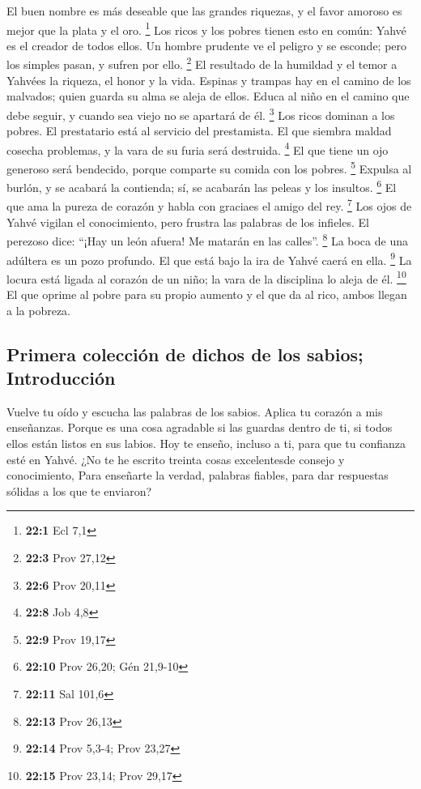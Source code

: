  El buen nombre es más deseable que las grandes riquezas,
y el favor amoroso es mejor que la plata y el oro. \footnote{\textbf{22:1}
  Ecl 7,1}  Los ricos y los pobres tienen esto en común:
Yahvé es el creador de todos ellos.  Un hombre prudente ve
el peligro y se esconde; pero los simples pasan, y sufren por ello.
\footnote{\textbf{22:3} Prov 27,12}  El resultado de la
humildad y el temor a Yahvées la riqueza, el honor y la vida.
 Espinas y trampas hay en el camino de los malvados; quien
guarda su alma se aleja de ellos.  Educa al niño en el
camino que debe seguir, y cuando sea viejo no se apartará de él.
\footnote{\textbf{22:6} Prov 20,11}  Los ricos dominan a
los pobres. El prestatario está al servicio del prestamista.
 El que siembra maldad cosecha problemas, y la vara de su
furia será destruida. \footnote{\textbf{22:8} Job 4,8}  El
que tiene un ojo generoso será bendecido, porque comparte su comida con
los pobres. \footnote{\textbf{22:9} Prov 19,17}  Expulsa
al burlón, y se acabará la contienda; sí, se acabarán las peleas y los
insultos. \footnote{\textbf{22:10} Prov 26,20; Gén 21,9-10}
 El que ama la pureza de corazón y habla con graciaes el
amigo del rey. \footnote{\textbf{22:11} Sal 101,6}  Los
ojos de Yahvé vigilan el conocimiento, pero frustra las palabras de los
infieles.  El perezoso dice: ``¡Hay un león afuera! Me
matarán en las calles''. \footnote{\textbf{22:13} Prov 26,13}
 La boca de una adúltera es un pozo profundo. El que está
bajo la ira de Yahvé caerá en ella. \footnote{\textbf{22:14} Prov 5,3-4;
  Prov 23,27}  La locura está ligada al corazón de un
niño; la vara de la disciplina lo aleja de él. \footnote{\textbf{22:15}
  Prov 23,14; Prov 29,17}  El que oprime al pobre para su
propio aumento y el que da al rico, ambos llegan a la pobreza.

\hypertarget{primera-colecciuxf3n-de-dichos-de-los-sabios-introducciuxf3n}{%
\subsection{Primera colección de dichos de los sabios;
Introducción}\label{primera-colecciuxf3n-de-dichos-de-los-sabios-introducciuxf3n}}

 Vuelve tu oído y escucha las palabras de los sabios.
Aplica tu corazón a mis enseñanzas.  Porque es una cosa
agradable si las guardas dentro de ti, si todos ellos están listos en
sus labios.  Hoy te enseño, incluso a ti, para que tu
confianza esté en Yahvé.  ¿No te he escrito treinta cosas
excelentesde consejo y conocimiento,  Para enseñarte la
verdad, palabras fiables, para dar respuestas sólidas a los que te
enviaron?

